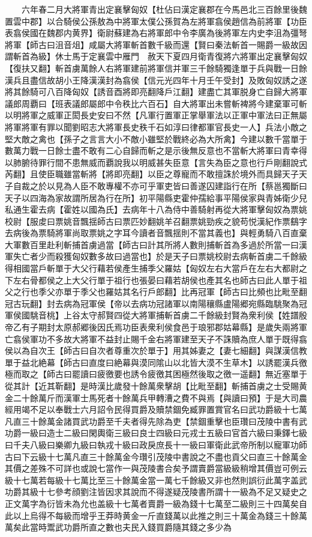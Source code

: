 　　六年春二月大將軍青出定襄擊匈奴【杜佔曰漢定襄郡在今馬邑北三百餘里後魏置雲中郡】以合騎侯公孫敖為中將軍太僕公孫賀為左將軍翕侯趙信為前將軍【功臣表翕侯國在魏郡内黄界】衛尉蘇建為右將軍郎中令李廣為後將軍左内史李沮為彊弩將軍【師古曰沮音俎】咸屬大將軍斬首數千級而還【賢曰秦法斬首一賜爵一級故因謂斬首為級】休士馬于定襄雲中雁門　赦天下夏四月衛青復將六將軍出定襄擊匈奴【復扶又翻】斬首虜萬餘人右將軍建前將軍信并軍三千餘騎獨逢單于兵與戰一日餘漢兵且盡信故胡小王降漢漢封為翕侯【信元光四年十月壬午受封】及敗匈奴誘之遂將其餘騎可八百降匈奴【誘音酉將即亮翻降戶江翻】建盡亡其軍脱身亡自歸大將軍議郎周覇曰【班表議郎屬郎中令秩比六百石】自大將軍出未嘗斬裨將今建棄軍可斬以明將軍之威軍正閎長史安曰不然【凡軍行置軍正掌舉軍法以正軍中軍法曰正無屬將軍將軍有罪以聞劉昭志大將軍長史秩千石如淳曰律都軍官長史一人】兵法小敵之堅大敵之禽也【孫子之言言大小不敵小雖堅於戰終必為大所禽】今建以數千當單于數萬力戰一日餘士盡不敢有二心自歸而斬之是示後無反意也不當斬大將軍曰青幸得以肺腑待罪行間不患無威而覇說我以明威甚失臣意【言失為臣之意也行戶剛翻說式芮翻】且使臣職雖當斬將【將即亮翻】以臣之尊寵而不敢擅誅於境外而具歸天子天子自裁之於以見為人臣不敢專權不亦可乎軍吏皆曰善遂囚建詣行在所【蔡邕獨斷曰天子以四海為家故謂所居為行在所】初平陽縣吏霍仲孺給事平陽侯家與青姊衛少兒私通生霍去病【霍姓以國為氏】去病年十八為侍中善騎射再從大將軍擊匈奴為票姚校尉【服䖍曰票姚音飄揺師古曰票匹妙翻姚羊召翻票姚勁疾之貌苟悦漢紀作票鷂字去病後為票騎將軍尚取票姚之字耳今讀者音飄揺則不當其義也】與輕勇騎八百直棄大軍數百里赴利斬捕首虜過當【師古曰計其所將人數則捕斬首為多過於所當一曰漢軍失亡者少而殺獲匈奴數多故曰過當也】於是天子曰票姚校尉去病斬首虜二千餘級得相國當戶斬單于大父行藉若侯產生捕季父羅姑【匈奴左右大當戶在左右大都尉之下左右骨都侯之上大父行單于祖行也張晏曰藉若胡侯也產其名也師古曰此人單于祖父之行也季父亦單于季父也羅姑其名行戶郎翻】比再冠軍【師古曰比頻也比毗至翻冠古玩翻】封去病為冠軍侯【帝以去病功冠諸軍以南陽穰縣盧陽郷宛縣臨駣聚為冠軍侯國駣音桃】上谷太守郝賢四從大將軍捕斬首虜二千餘級封賢為衆利侯【姓譜殷帝乙有子期封太原郝郷後因氏焉功臣表衆利侯食邑于琅邪郡姑幕縣】是歲失兩將軍亡翕侯軍功不多故大將軍不益封止賜千金右將軍建至天子不誅贖為庶人單于既得翕侯以為自次王【師古曰自次者尊重次於單于】用其姊妻之【妻七細翻】與謀漢信教單于益北絶幕【師古曰直度曰絶幕與漠同隂山以北皆大漠不生草木】以誘罷漢兵徼極而取之【師古曰罷讀曰疲徼要也誘令疲徼其困極然後取之徼一遥翻】無近塞單于從其計【近其靳翻】是時漢比歲發十餘萬衆擊胡【比毗至翻】斬捕首虜之士受賜黄金二十餘萬斤而漢軍士馬死者十餘萬兵甲轉漕之費不與焉【與讀曰預】于是大司農經用竭不足以奉戰士六月詔令民得買爵及贖禁錮免臧罪置賞官名曰武功爵級十七萬凡直三十餘萬金諸買武功爵至千夫者得先除為吏【禁錮重擊也臣瓚曰茂陵中書有武功爵一級曰造士二級曰閑輿衛三級曰良士四級曰元戎士五級曰官首六級曰秉鐸七級曰千夫八級曰樂卿九級曰執戎十級曰政戾庶長十一級曰軍衛此武帝所制以寵軍功師古曰下云級十七萬凡直三十餘萬金今瓚引茂陵中書說之不盡也貢父曰直三十餘萬金其價之差殊不可詳也或說七當作一與茂陵書合矣予謂賣爵當級級稍增其價豈可例云級十七萬若每級十七萬比至三十餘萬金當一萬七千餘級又非也然則誤衍此萬字盖武功爵其級十七參考顔劉注皆因求其說而不得遂疑茂陵書所謂十一級為不足又疑史之正文萬字為衍皆未為允也盖級十七萬者賣爵一級為錢十七萬至二級則三十四萬矣自此以上烏得不每級而增乎王莽時黄金一斤直錢萬以此推之則三十萬金為錢三十餘萬萬矣此當時鬻武功爵所直之數也夫民入錢買爵隨其錢之多少為